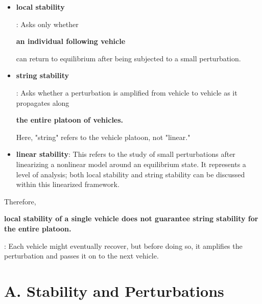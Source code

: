 \documentclass[11pt,a4paper,openany]{book}
\numberwithin{equation}{chapter}
\numberwithin{figure}{chapter}
\numberwithin{table}{chapter}
\begin{document}
\begin{tcolorbox}[notebox,title=\textbf{The three most easily confused types of "stability"}]
\begin{itemize}[leftmargin=1.4em,itemsep=4pt]
\item \textbf{local stability}

: Asks only whether

\textbf{an individual following vehicle}

can return to equilibrium after being subjected to a small perturbation.


\item \textbf{string stability}

: Asks whether a perturbation is amplified from vehicle to vehicle as it propagates along

\textbf{the entire platoon of vehicles.}

Here, "string" refers to the vehicle platoon, not "linear."


\item \textbf{linear stability}: This refers to the study of small perturbations after linearizing a nonlinear model around an equilibrium state. It represents a level of analysis; both local stability and string stability can be discussed within this linearized framework.


\end{itemize}

Therefore,

\textbf{local stability of a single vehicle does not guarantee string stability for the entire platoon.}

: Each vehicle might eventually recover, but before doing so, it amplifies the perturbation and passes it on to the next vehicle.


\end{tcolorbox}

\section*{A. Stability and Perturbations}
\end{document}
